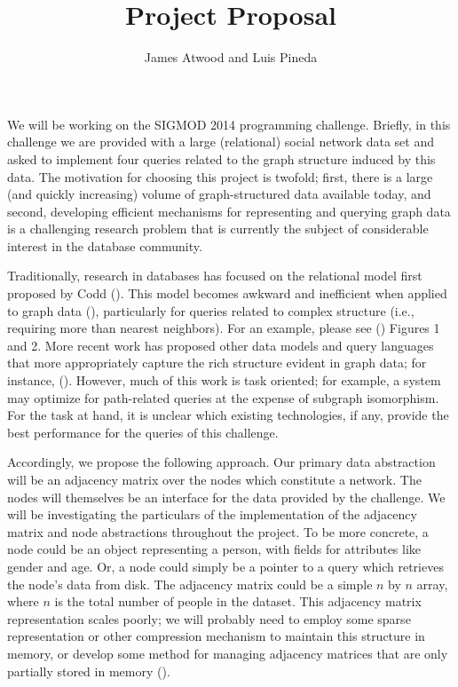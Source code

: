 \documentclass{article}
\title{Project Proposal}
\author{
James Atwood and Luis Pineda \\ %
}
\begin{document}
\maketitle

We will be working on the SIGMOD 2014 programming challenge.  Briefly, in this challenge we are provided with a large (relational) social network data set and asked to implement four queries related to the graph structure induced by this data.  The motivation for choosing this project is twofold; first, there is a large (and quickly increasing) volume of graph-structured data available today, and second, developing efficient mechanisms for representing and querying graph data is a challenging research problem that is currently the subject of considerable interest in the database community.

Traditionally, research in databases has focused on the relational model first proposed by Codd  (\cite{codd1970relational}).  This model becomes awkward and inefficient when applied to graph data (\cite{rodriguez2011graph}), particularly for queries related to complex structure (i.e., requiring more than nearest neighbors).  For an example, please see (\cite{he2008graphs}) Figures 1 and 2.  More recent work has proposed other data models and query languages that more appropriately capture the rich structure evident in graph data; for instance, (\cite{angles2008survey,he2008graphs,sun2012efficient,low2010graphlab}).  However, much of this work is task oriented; for example, a system may optimize for path-related queries at the expense of subgraph isomorphism.  For the task at hand, it is unclear which existing technologies, if any, provide the best performance for the queries of this challenge.

Accordingly, we propose the following approach.  Our primary data abstraction will be an adjacency matrix over the nodes which constitute a network.  The nodes will themselves be an interface for the data provided by the challenge.  We will be investigating the particulars of the implementation of the adjacency matrix and node abstractions throughout the project. To be more concrete, a node could be an object representing a person, with fields for attributes like gender and age.  Or, a node could simply be a pointer to a query which retrieves the node's data from disk.  The adjacency matrix could be a simple $n$ by $n$ array, where $n$ is the total number of people in the dataset.  This adjacency matrix representation scales poorly; we will probably need to employ some sparse representation or other compression mechanism to maintain this structure in memory, or develop some method for managing adjacency matrices that are only partially stored in memory (\cite{wang2004scalable}).
\end{document}
